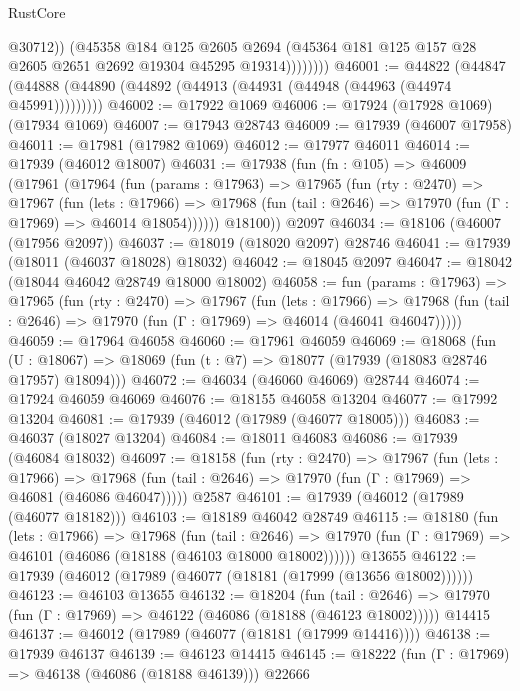 \begin{lexlean}{RustCore}
\begin{coremodule}
                    @30712))
                (@45358
                  @184
                  @125
                  @2605
                  @2694
                  (@45364 @181 @125 @157 @28 @2605 @2651 @2692 @19304 @45295 @19314))))))))
@46001 := @44822
    (@44847 (@44888 (@44890 (@44892 (@44913 (@44931 (@44948 (@44963 (@44974 @45991)))))))))
@46002 := @17922 @1069
@46006 := @17924 (@17928 @1069) (@17934 @1069)
@46007 := @17943 @28743
@46009 := @17939 (@46007 @17958)
@46011 := @17981 (@17982 @1069)
@46012 := @17977 @46011
@46014 := @17939 (@46012 @18007)
@46031 := @17938
    (fun (fn : @105) =>
    @46009
      (@17961
        (@17964
          (fun (params : @17963) =>
          @17965
            (fun (rty : @2470) =>
            @17967
              (fun (lets : @17966) =>
              @17968 (fun (tail : @2646) => @17970 (fun (Γ : @17969) => @46014 @18054))))))
        @18100))
    @2097
@46034 := @18106 (@46007 (@17956 @2097))
@46037 := @18019 (@18020 @2097) @28746
@46041 := @17939 (@18011 (@46037 @18028) @18032)
@46042 := @18045 @2097
@46047 := @18042 (@18044 @46042 @28749 @18000 @18002)
@46058 := fun (params : @17963) =>
  @17965
    (fun (rty : @2470) =>
    @17967
      (fun (lets : @17966) =>
      @17968 (fun (tail : @2646) => @17970 (fun (Γ : @17969) => @46014 (@46041 @46047)))))
@46059 := @17964 @46058
@46060 := @17961 @46059
@46069 := @18068
    (fun (U : @18067) => @18069 (fun (t : @7) => @18077 (@17939 (@18083 @28746 @17957) @18094)))
@46072 := @46034 (@46060 @46069) @28744
@46074 := @17924 @46059 @46069
@46076 := @18155 @46058 @13204
@46077 := @17992 @13204
@46081 := @17939 (@46012 (@17989 (@46077 @18005)))
@46083 := @46037 (@18027 @13204)
@46084 := @18011 @46083
@46086 := @17939 (@46084 @18032)
@46097 := @18158
    (fun (rty : @2470) =>
    @17967
      (fun (lets : @17966) =>
      @17968 (fun (tail : @2646) => @17970 (fun (Γ : @17969) => @46081 (@46086 @46047)))))
    @2587
@46101 := @17939 (@46012 (@17989 (@46077 @18182)))
@46103 := @18189 @46042 @28749
@46115 := @18180
    (fun (lets : @17966) =>
    @17968
      (fun (tail : @2646) =>
      @17970 (fun (Γ : @17969) => @46101 (@46086 (@18188 (@46103 @18000 @18002))))))
    @13655
@46122 := @17939 (@46012 (@17989 (@46077 (@18181 (@17999 (@13656 @18002))))))
@46123 := @46103 @13655
@46132 := @18204
    (fun (tail : @2646) => @17970 (fun (Γ : @17969) => @46122 (@46086 (@18188 (@46123 @18002)))))
    @14415
@46137 := @46012 (@17989 (@46077 (@18181 (@17999 @14416))))
@46138 := @17939 @46137
@46139 := @46123 @14415
@46145 := @18222 (fun (Γ : @17969) => @46138 (@46086 (@18188 @46139))) @22666

\end{coremodule}
\end{lexlean}
